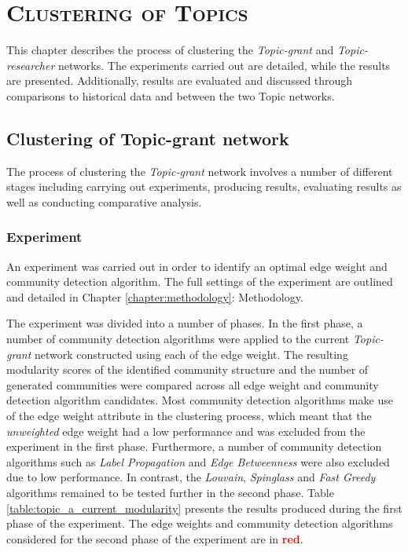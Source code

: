 \chapter{\textsc{Clustering of Topics}}
\label{chapter:clustering_of_topics}

This chapter describes the process of clustering the \textit{Topic-grant} and \textit{Topic-researcher} networks. The experiments carried out are detailed, while the results are presented. Additionally, results are evaluated and discussed through comparisons to historical data and between the two Topic networks.

\section{Clustering of Topic-grant network}

The process of clustering the \textit{Topic-grant} network involves a number of different stages including carrying out experiments, producing results, evaluating results as well as conducting comparative analysis.

\subsection{Experiment}

An experiment was carried out in order to identify an optimal edge weight and community detection algorithm. The full settings of the experiment are outlined and detailed in Chapter \ref{chapter:methodology}: Methodology.

The experiment was divided into a number of phases. In the first phase, a number of community detection algorithms were applied to the current \textit{Topic-grant} network constructed using each of the edge weight. The resulting modularity scores of the identified community structure and the number of generated communities were compared across all edge weight and community detection algorithm candidates. Most community detection algorithms make use of the edge weight attribute in the clustering process, which meant that the \textit{unweighted} edge weight had a low performance and was excluded from the experiment in the first phase. Furthermore, a number of community detection algorithms such as \textit{Label Propagation} and \textit{Edge Betweenness} were also excluded due to low performance. In contrast, the \textit{Louvain}, \textit{Spinglass} and \textit{Fast Greedy} algorithms remained to be tested further in the second phase. Table \ref{table:topic_a_current_modularity} presents the results produced during the first phase of the experiment. The edge weights and community detection algorithms considered for the second phase of the experiment are in \textcolor{red}{\textbf{red}}.

